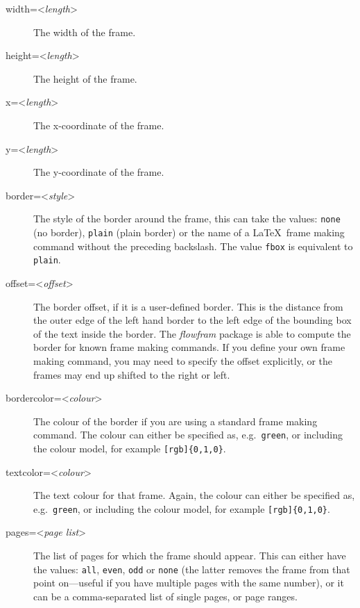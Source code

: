 \documentclass[a4paper]{report}
\providecommand{\meta}[1]{\textnormal{\textless\textit{#1}\textgreater}}
\begin{document}
\begin{description}
\item[width=\meta{length}]\mbox{}\par  The width of the frame.

\item[height=\meta{length}]\mbox{}\par The height of the frame.

\item[x=\meta{length}]\mbox{}\par The x-coordinate of the frame.

\item[y=\meta{length}]\mbox{}\par The y-coordinate of the frame.

\item[border=\meta{style}]\mbox{}\par The style of the border around the 
frame, this can take the values: \texttt{none} (no border),
\texttt{plain} (plain border) or the name of a \LaTeX\ 
frame making command without the preceding backslash. 
The value \texttt{fbox} is equivalent to \texttt{plain}.

\item[offset=\meta{offset}]\mbox{}\par The border offset, if it is a 
user-defined border.  This is the distance from the outer
edge of the left hand border to the left edge of the
bounding box of the text inside the border.  The \textsl{flowfram}
package is able to compute the border for 
known frame making commands. 
If you define your own frame making command, you may need to 
specify the offset explicitly, or the frames 
may end up shifted to the right or left.

\item[bordercolor=\meta{colour}]\mbox{}\par The colour of the border
if you are using a standard frame making command.
The colour can either be specified as, e.g.\ \texttt{green},
or including the colour model, for example 
\verb/[rgb]{0,1,0}/.

\item[textcolor=\meta{colour}]\mbox{}\par The text colour for that 
frame. Again, the colour can either be specified as, 
e.g.\ \texttt{green}, or including the colour model, 
for example \verb/[rgb]{0,1,0}/.

\item[pages=\meta{page list}]\mbox{}\par The {list of 
pages} for which the frame
should appear. This can either have the values: \texttt{all},
\texttt{even}, \texttt{odd} or \texttt{none} (the latter 
removes the frame from that point on---useful if you
have multiple pages with the same number), or it can be a 
comma-separated list of single pages, or 
{page ranges}.


\end{description}
\end{document}
